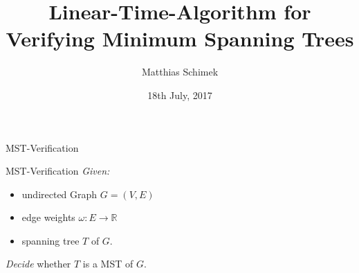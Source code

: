 \documentclass[18pt]{beamer}
\title[Linear-Time Algorithm for Verifiying MST]{Linear-Time-Algorithm for Verifying Minimum Spanning Trees}
\author{Matthias Schimek}
\institute{Institute of Theoretical Informatics}
\date{18th July, 2017}
\begin{document}

\begin{frame}
\titlepage
\end{frame}

\begin{frame}{MST-Verification}
	\begin{block}{MST-Verification}
	\emph{Given:} 
	\begin{itemize}
		\item undirected Graph $G=(V,E)$
		\item edge weights $\omega: E \rightarrow \mathbb{R}$
		\item spanning tree $T$ of $G$.
	\end{itemize}
	\emph{Decide} whether $T$ is a MST of $G$.
	\end{block}

\end{frame}
\end{document}
